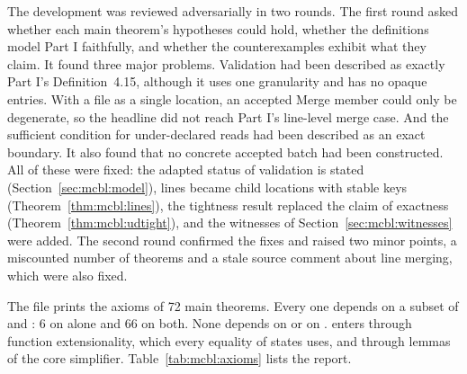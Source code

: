 \documentclass[11pt,letterpaper]{article}
\theoremstyle{definition}
\theoremstyle{remark}
\begin{document}
The development was reviewed adversarially in two rounds. The first round asked whether each main theorem's hypotheses could hold, whether the definitions model Part I faithfully, and whether the counterexamples exhibit what they claim. It found three major problems. Validation had been described as exactly Part I's Definition~4.15, although it uses one granularity and has no opaque entries. With a file as a single location, an accepted Merge member could only be degenerate, so the headline did not reach Part I's line-level merge case. And the sufficient condition for under-declared reads had been described as an exact boundary. It also found that no concrete accepted batch had been constructed. All of these were fixed: the adapted status of validation is stated (Section~\ref{sec:mcbl:model}), lines became child locations with stable keys (Theorem~\ref{thm:mcbl:lines}), the tightness result replaced the claim of exactness (Theorem~\ref{thm:mcbl:udtight}), and the witnesses of Section~\ref{sec:mcbl:witnesses} were added. The second round confirmed the fixes and raised two minor points, a miscounted number of theorems and a stale source comment about line merging, which were also fixed.

The file  prints the axioms of 72 main theorems. Every one depends on a subset of  and : 6 on  alone and 66 on both. None depends on  or on .  enters through function extensionality, which every equality of states uses, and through lemmas of the core simplifier. Table~\ref{tab:mcbl:axioms} lists the report.
\end{document}
